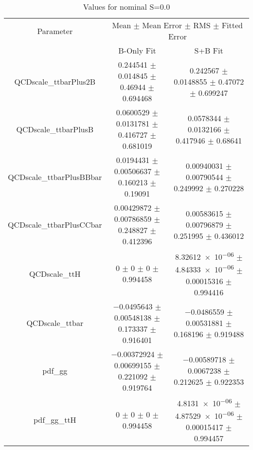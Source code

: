 \begin{table}
\centering
\caption{Values for nominal S=0.0}
\begin{tabular}{ccc}
\toprule
Parameter & \multicolumn{2}{c}{Mean $\pm$ Mean Error $\pm$ RMS $\pm$ Fitted Error}\\
 & B-Only Fit & S+B Fit\\
\midrule
QCDscale\_ttbarPlus2B & \num{0.244541} $\pm$ \num{0.014845} $\pm$ \num{0.46944} $\pm$ \num{0.694468} & \num{0.242567} $\pm$ \num{0.0148855} $\pm$ \num{0.47072} $\pm$ \num{0.699247}\\
QCDscale\_ttbarPlusB & \num{0.0600529} $\pm$ \num{0.0131781} $\pm$ \num{0.416727} $\pm$ \num{0.681019} & \num{0.0578344} $\pm$ \num{0.0132166} $\pm$ \num{0.417946} $\pm$ \num{0.68641}\\
QCDscale\_ttbarPlusBBbar & \num{0.0194431} $\pm$ \num{0.00506637} $\pm$ \num{0.160213} $\pm$ \num{0.19091} & \num{0.00940031} $\pm$ \num{0.00790544} $\pm$ \num{0.249992} $\pm$ \num{0.270228}\\
QCDscale\_ttbarPlusCCbar & \num{0.00429872} $\pm$ \num{0.00786859} $\pm$ \num{0.248827} $\pm$ \num{0.412396} & \num{0.00583615} $\pm$ \num{0.00796879} $\pm$ \num{0.251995} $\pm$ \num{0.436012}\\
QCDscale\_ttH & \num{0} $\pm$ \num{0} $\pm$ \num{0} $\pm$ \num{0.994458} & \num{8.32612e-06} $\pm$ \num{4.84333e-06} $\pm$ \num{0.00015316} $\pm$ \num{0.994416}\\
QCDscale\_ttbar & \num{-0.0495643} $\pm$ \num{0.00548138} $\pm$ \num{0.173337} $\pm$ \num{0.916401} & \num{-0.0486559} $\pm$ \num{0.00531881} $\pm$ \num{0.168196} $\pm$ \num{0.919488}\\
pdf\_gg & \num{-0.00372924} $\pm$ \num{0.00699155} $\pm$ \num{0.221092} $\pm$ \num{0.919764} & \num{-0.00589718} $\pm$ \num{0.0067238} $\pm$ \num{0.212625} $\pm$ \num{0.922353}\\
pdf\_gg\_ttH & \num{0} $\pm$ \num{0} $\pm$ \num{0} $\pm$ \num{0.994458} & \num{4.8131e-06} $\pm$ \num{4.87529e-06} $\pm$ \num{0.00015417} $\pm$ \num{0.994457}\\
\bottomrule
\end{tabular}
\end{table}